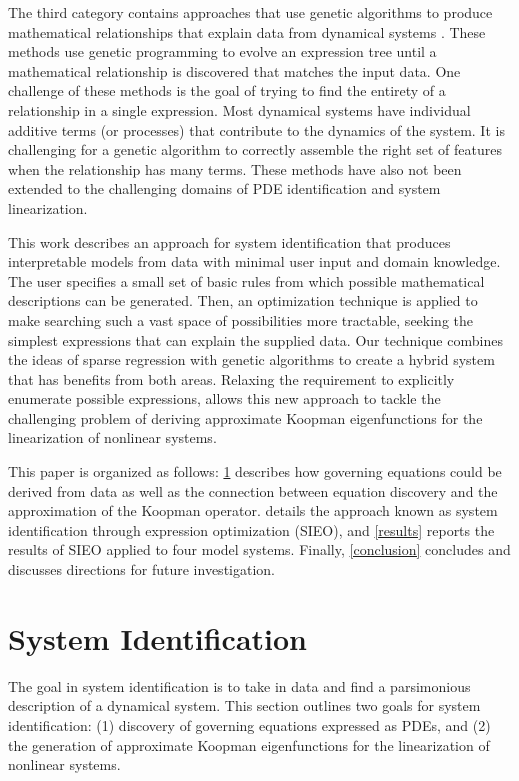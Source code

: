 \documentclass{article}
\begin{document}
The third category contains approaches that use genetic algorithms to produce mathematical relationships that explain data from dynamical systems \cite{hitoshi1995numerical,gray1998nonlinear,rodriequez2004identifying,madar2005genetic}. These methods use genetic programming to evolve an expression tree until a mathematical relationship is discovered that matches the input data. One challenge of these methods is the goal of trying to find the entirety of a relationship in a single expression. Most dynamical systems have individual additive terms (or processes) that contribute to the dynamics of the system. It is challenging for a genetic algorithm to correctly assemble the right set of features when the relationship has many terms. These methods have also not been extended to the challenging domains of PDE identification and system linearization.

This work describes an approach for system identification that produces interpretable models from data with minimal user input and domain knowledge. The user specifies a small set of basic rules from which possible mathematical descriptions can be generated. Then, an optimization technique is applied to make searching such a vast space of possibilities more tractable, seeking the simplest expressions that can explain the supplied data. Our technique combines the ideas of sparse regression with genetic algorithms to create a hybrid system that has benefits from both areas. Relaxing the requirement to explicitly enumerate possible expressions, allows this new approach to tackle the challenging problem of deriving approximate Koopman eigenfunctions for the linearization of nonlinear systems.

This paper is organized as follows: \cref{systemidentification} describes how governing equations could be derived from data as well as the connection between equation discovery and the approximation of the Koopman operator.  details the approach known as system identification through expression optimization (SIEO), and \cref{results} reports the results of SIEO applied to four model systems. Finally, \cref{conclusion} concludes and discusses directions for future investigation. 



\section{System Identification}
\label{systemidentification}

The goal in system identification is to take in data and find a parsimonious description of a dynamical system. This section outlines two goals for system identification: (1) discovery of governing equations expressed as PDEs, and (2) the generation of approximate Koopman eigenfunctions for the linearization of nonlinear systems.
\end{document}
